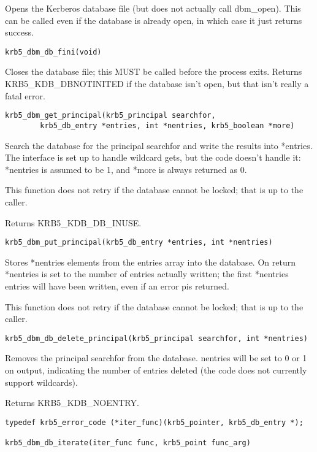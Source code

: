 Opens the Kerberos database file (but does not actually call
dbm_open).  This can be called even if the database is already open,
in which case it just returns success.

\begin{verbatim}
krb5_dbm_db_fini(void)
\end{verbatim}

Closes the database file; this MUST be called before the process
exits.  Returns KRB5_KDB_DBNOTINITED if the database isn't open, but
that isn't really a fatal error.

\begin{verbatim}
krb5_dbm_get_principal(krb5_principal searchfor, 
        krb5_db_entry *entries, int *nentries, krb5_boolean *more)
\end{verbatim}

Search the database for the principal searchfor and write the results
into *entries.  The interface is set up to handle wildcard gets, but
the code doesn't handle it: *nentries is assumed to be 1, and *more is
always returned as 0.

This function does not retry if the database cannot be locked; that is
up to the caller.  

Returns KRB5_KDB_DB_INUSE.

\begin{verbatim}
krb5_dbm_put_principal(krb5_db_entry *entries, int *nentries)
\end{verbatim}

Stores *nentries elements from the entries array into the database.
On return *nentries is set to the number of entries actually written;
the first *nentries entries will have been written, even if an error
pis returned.

This function does not retry if the database cannot be locked; that is
up to the caller.

\begin{verbatim}
krb5_dbm_db_delete_principal(krb5_principal searchfor, int *nentries)
\end{verbatim}

Removes the principal searchfor from the database.  nentries will be
set to 0 or 1 on output, indicating the number of entries deleted (the
code does not currently support wildcards).

Returns KRB5_KDB_NOENTRY.

\begin{verbatim}
typedef krb5_error_code (*iter_func)(krb5_pointer, krb5_db_entry *);

krb5_dbm_db_iterate(iter_func func, krb5_point func_arg)
\end{verbatim}

